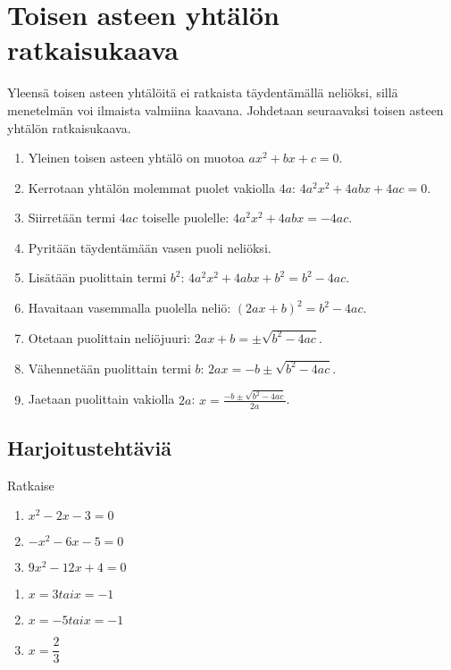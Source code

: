 \chapter{Toisen asteen yhtälön ratkaisukaava}

Yleensä toisen asteen yhtälöitä ei ratkaista täydentämällä neliöksi, sillä menetelmän voi ilmaista valmiina kaavana.
Johdetaan seuraavaksi toisen asteen yhtälön ratkaisukaava.

\begin{enumerate}
    \item Yleinen toisen asteen yhtälö on muotoa $ax^2+bx+c=0$.
    \item Kerrotaan yhtälön molemmat puolet vakiolla $4a$: $4a^2x^2+4abx+4ac=0$.
    \item Siirretään termi $4ac$ toiselle puolelle: $4a^2x^2+4abx=-4ac$.
    \item Pyritään täydentämään vasen puoli neliöksi.
    \item Lisätään puolittain termi $b^2$: $4a^2x^2+4abx+b^2=b^2-4ac$.
    \item Havaitaan vasemmalla puolella neliö: $(2ax+b)^2=b^2-4ac$.
    \item Otetaan puolittain neliöjuuri: $2ax+b=\pm\sqrt{b^2-4ac}$.
    \item Vähennetään puolittain termi $b$: $2ax=-b\pm\sqrt{b^2-4ac}$.
    \item Jaetaan puolittain vakiolla $2a$: $x=\frac{-b\pm\sqrt{b^2-4ac}}{2a}$.
\end{enumerate}

\section{Harjoitustehtäviä}

\begin{tehtava}
    Ratkaise
    \begin{enumerate}
        \item $x^2 - 2x - 3 = 0$
        \item $-x^2 - 6x - 5 = 0$
        \item $9x^2 - 12x + 4 = 0$
    \end{enumerate}
    \begin{vastaus}
        \begin{enumerate}
            \item $x = 3 tai x = -1$
            \item $x = -5 tai x = -1$
            \item $x = \dfrac{2}{3}$
        \end{enumerate}
    \end{vastaus}
\end{tehtava}

